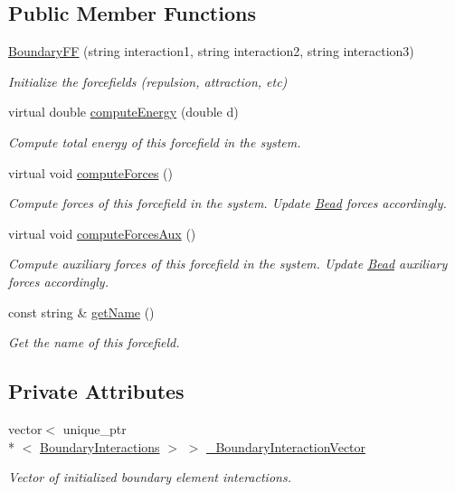\subsection*{Public Member Functions}
\begin{DoxyCompactItemize}
\item 
\hyperlink{classBoundaryFF_adc5b93d797c1a0b58445625311fc00af}{Boundary\+F\+F} (string interaction1, string interaction2, string interaction3)
\begin{DoxyCompactList}\small\item\em Initialize the forcefields (repulsion, attraction, etc) \end{DoxyCompactList}\item 
virtual double \hyperlink{classBoundaryFF_a3a3c0dd0f82424d358c6b19abea9b743}{compute\+Energy} (double d)
\begin{DoxyCompactList}\small\item\em Compute total energy of this forcefield in the system. \end{DoxyCompactList}\item 
virtual void \hyperlink{classBoundaryFF_a6ae273b9af97e9f50923958c486ec7f7}{compute\+Forces} ()
\begin{DoxyCompactList}\small\item\em Compute forces of this forcefield in the system. Update \hyperlink{classBead}{Bead} forces accordingly. \end{DoxyCompactList}\item 
virtual void \hyperlink{classBoundaryFF_abf4fc3bd031457f68611c239f955da83}{compute\+Forces\+Aux} ()
\begin{DoxyCompactList}\small\item\em Compute auxiliary forces of this forcefield in the system. Update \hyperlink{classBead}{Bead} auxiliary forces accordingly. \end{DoxyCompactList}\item 
const string \& \hyperlink{classForceField_a4a09e09603b4c4650dc7b3b0f0912fd2}{get\+Name} ()
\begin{DoxyCompactList}\small\item\em Get the name of this forcefield. \end{DoxyCompactList}\end{DoxyCompactItemize}
\subsection*{Private Attributes}
\begin{DoxyCompactItemize}
\item 
vector$<$ unique\+\_\+ptr\\*
$<$ \hyperlink{classBoundaryInteractions}{Boundary\+Interactions} $>$ $>$ \hyperlink{classBoundaryFF_ae2eab3aa7d1d57be9bd511249b54e074}{\+\_\+\+Boundary\+Interaction\+Vector}
\begin{DoxyCompactList}\small\item\em Vector of initialized boundary element interactions. \end{DoxyCompactList}\end{DoxyCompactItemize}



